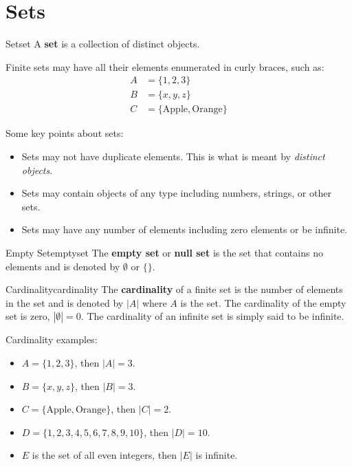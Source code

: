 \section{Sets}

\begin{definition}{Set}{set}
  A \textbf{set} is a collection of distinct objects. 
\end{definition}

Finite sets may have all their elements enumerated in curly braces, such as:
\begin{align}
  A &= \{ 1, 2, 3 \} \\
  B &= \{ x, y, z \} \\
  C &= \{ \text{Apple}, \text{Orange} \}
\end{align}

Some key points about sets:
\begin{itemize}
  \item Sets may not have duplicate elements. This is what is meant by 
  \emph{distinct objects}.
  \item Sets may contain objects of any type including numbers, strings, or other sets.
  \item Sets may have any number of elements including zero elements or be infinite.
\end{itemize}

\begin{definition}{Empty Set}{emptyset}
  The \textbf{empty set} or \textbf{null set} is the set that contains no elements 
  and is denoted by \( \emptyset \) or \( \{ \} \).
\end{definition}

\begin{definition}{Cardinality}{cardinality}
  The \textbf{cardinality} of a finite set is the number of elements in the set and is 
  denoted by \( |A| \) where \( A \) is the set. The cardinality of the empty 
  set is zero, \( |\emptyset| = 0 \). The cardinality of an infinite set is simply said to be
  infinite.
\end{definition}

Cardinality examples:
\begin{itemize}
  \item \( A = \{ 1, 2, 3 \} \), then \( |A| = 3 \).
  \item \( B = \{ x, y, z \} \), then \( |B| = 3 \).
  \item \( C = \{ \text{Apple}, \text{Orange} \} \), then \( |C| = 2 \).
  \item \( D = \{ 1, 2, 3, 4, 5, 6, 7, 8, 9, 10 \} \), then \( |D| = 10 \).
  \item \( E \) is the set of all even integers, then \( |E| \) is infinite.
\end{itemize}

